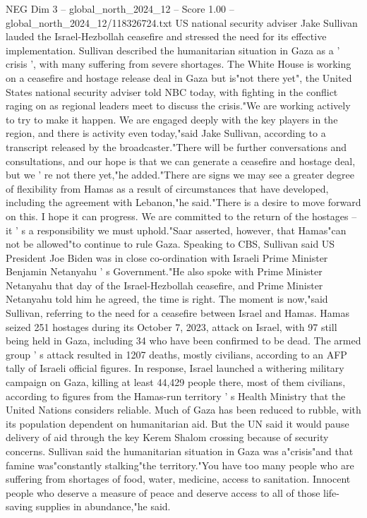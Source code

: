 \begin{textsample}{NEG Dim 3 – global\_north\_2024\_12 – Score 1.00 – global\_north\_2024\_12/118326724.txt}  \label{ex:f3_neg_246}
US national security adviser Jake Sullivan lauded the Israel-Hezbollah ceasefire and stressed the need for its effective implementation.
Sullivan described the humanitarian situation in Gaza as a ' crisis ', with many suffering from severe shortages.
The White House is working on a ceasefire and hostage release deal in Gaza but is"not there yet", the United States national security adviser told NBC today, with fighting in the conflict raging on as regional leaders meet to discuss the crisis."We are working actively to try to make it happen.
We are engaged deeply with the key players in the region, and there is activity even today,"said Jake Sullivan, according to a transcript released by the broadcaster."There will be further conversations and consultations, and our hope is that we can generate a ceasefire and hostage deal, but we ' re not there yet,"he added."There are signs we may see a greater degree of flexibility from Hamas as a result of circumstances that have developed, including the agreement with Lebanon,"he said."There is a desire to move forward on this.
I hope it can progress.
We are committed to the return of the hostages -- it ' s a responsibility we must uphold."Saar asserted, however, that Hamas"can not be allowed"to continue to rule Gaza.
Speaking to CBS, Sullivan said US President Joe Biden was in close co-ordination with Israeli Prime Minister Benjamin Netanyahu ' s Government."He also spoke with Prime Minister Netanyahu that day of the Israel-Hezbollah ceasefire, and Prime Minister Netanyahu told him he agreed, the time is right.
The moment is now,"said Sullivan, referring to the need for a ceasefire between Israel and Hamas.
Hamas seized 251 hostages during its October 7, 2023, attack on Israel, with 97 still being held in Gaza, including 34 who have been confirmed to be dead.
The armed group ' s attack resulted in 1207 deaths, mostly civilians, according to an AFP tally of Israeli official figures.
In response, Israel launched a withering military campaign on Gaza, killing at least 44,429 people there, most of them civilians, according to figures from the Hamas-run territory ' s Health Ministry that the United Nations considers reliable.
Much of Gaza has been reduced to rubble, with its population dependent on humanitarian aid.
But the UN said it would pause delivery of aid through the key Kerem Shalom crossing because of security concerns.
Sullivan said the humanitarian situation in Gaza was a"crisis"and that famine was"constantly stalking"the territory."You have too many people who are suffering from shortages of food, water, medicine, access to sanitation.
Innocent people who deserve a measure of peace and deserve access to all of those life-saving supplies in abundance,"he said.

\end{textsample}
